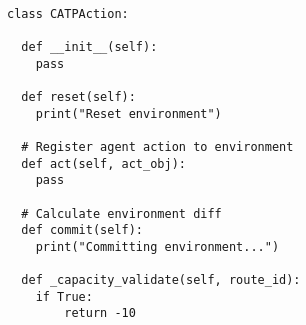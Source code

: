 \begin{lstlisting}[caption = 行動を定義するクラス, label = program1]

class CATPAction:

  def __init__(self):
    pass

  def reset(self):
    print("Reset environment")

  # Register agent action to environment
  def act(self, act_obj):
    pass

  # Calculate environment diff
  def commit(self):
    print("Committing environment...")

  def _capacity_validate(self, route_id):  
    if True:
        return -10  
\end{lstlisting}
  



